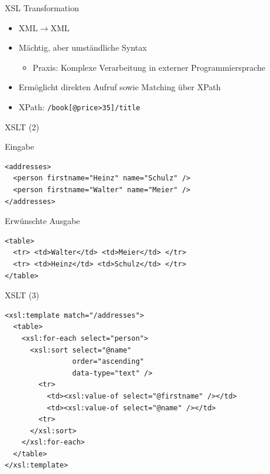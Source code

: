 \documentclass{beamer}
\newcommand{\pfeil}{\item[$\Rightarrow$]}
\newcommand\ato{\rightarrow} %
\begin{document}
\begin{frame}[fragile]{XSL Transformation}
  \begin{itemize}
  \item $\mathrm{XML} \ato \mathrm{XML}$
  \item Mächtig, aber umständliche Syntax
    \begin{itemize}
    \pfeil Praxis: Komplexe Verarbeitung in externer
      Programmiersprache
    \end{itemize}
  \item Ermöglicht direkten Aufruf sowie Matching über XPath
  \item XPath: \verb+/book[@price>35]/title+
  \end{itemize}
\end{frame}

\begin{frame}[fragile]{XSLT (2)}

  \begin{block}{Eingabe}
\begin{verbatim}
<addresses>
  <person firstname="Heinz" name="Schulz" />
  <person firstname="Walter" name="Meier" />
</addresses>
\end{verbatim}
  \end{block}
  \begin{block}{Erwünschte Ausgabe}
\begin{verbatim}
<table>
  <tr> <td>Walter</td> <td>Meier</td> </tr>
  <tr> <td>Heinz</td> <td>Schulz</td> </tr>
</table>    
\end{verbatim}
\end{block}
\end{frame}

\begin{frame}[fragile]{XSLT (3)}
\begin{verbatim}
<xsl:template match="/addresses">
  <table>
    <xsl:for-each select="person">
      <xsl:sort select="@name" 
                order="ascending" 
                data-type="text" />
        <tr>
          <td><xsl:value-of select="@firstname" /></td>
          <td><xsl:value-of select="@name" /></td>
        <tr>
      </xsl:sort>
    </xsl:for-each>
  </table>
</xsl:template>
\end{verbatim}
\end{frame}
\end{document}
